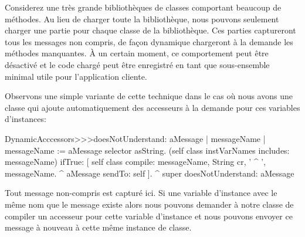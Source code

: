 \documentclass[a4paper,10pt,twoside]{book}
\begin{document}

Considerez une très grande bibliothèques de classes comportant beaucoup de méthodes. Au lieu de charger toute la bibliothèque, nous pouvons seulement charger une partie pour chaque classe de la bibliothèque. Ces parties captureront tous les messages non compris, de façon dynamique chargeront à la demande les méthodes manquantes. À un certain moment, ce comportement peut être désactivé et le code chargé peut être enregistré en tant que sous-ensemble minimal utile pour l'application cliente.


Observons une simple variante de cette technique dans le cas où nous avons une classe qui ajoute automatiquement des accesseurs à la demande pour ces variables d'instances:

\begin{code}{}
DynamicAcccessors>>>doesNotUnderstand: aMessage
	| messageName |
	messageName := aMessage selector asString.
	(self class instVarNames includes: messageName)
		ifTrue: [
			self class compile: messageName, String cr, ' ^ ', messageName.
			^ aMessage sendTo: self ].
	^ super doesNotUnderstand: aMessage
\end{code}
Tout message non-compris est capturé ici. Si une variable d'instance avec le même nom que le message existe alors nous pouvons demander à notre classe de compiler un accesseur pour cette variable d'instance et nous pouvons envoyer ce message à nouveau
à cette même instance de classe.
\end{document}
